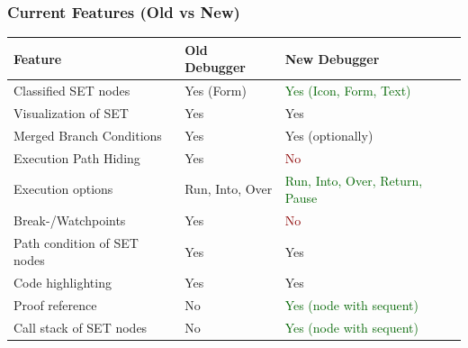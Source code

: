 \documentclass[accentcolor=tud9d,colorbacktitle,inverttitle,landscape,english,presentation,t]{tudbeamer}
\begin{document}
   	\begin{frame}[t]
		\frametitle{Current Features (Old vs New)}
      
      \begin{table}
         \centering
            \begin{tabular}{|l|l|l|}
               \hline
               Feature & Old Debugger & New Debugger \\
               \hline
               \hline
               Classified SET nodes & Yes (Form) & \textcolor{darkgreen}{Yes (Icon, Form, Text)} \\
               Visualization of SET & Yes & Yes \\
               Merged Branch Conditions & Yes & Yes (optionally) \\
               Execution Path Hiding & Yes & \textcolor{darkred}{No} \\ %
               Execution options & Run, Into, Over & \textcolor{darkgreen}{Run, Into, Over, Return, Pause} \\
               Break-/Watchpoints & Yes & \textcolor{darkred}{No} \\
               Path condition of SET nodes & Yes & Yes \\
               Code highlighting & Yes & Yes \\
               Proof reference & No & \textcolor{darkgreen}{Yes (node with sequent)} \\
               Call stack of SET nodes & No & \textcolor{darkgreen}{Yes (node with sequent)} \\
               \hline
            \end{tabular}
      \end{table}
	\end{frame}
   
\end{document}
